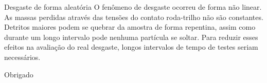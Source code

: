 \documentclass{beamer}
\begin{document}
\begin{frame}
\begin{block}{Desgaste de forma aleatória}
	O fenômeno de desgaste ocorreu de forma não linear. As massas perdidas através das tensões do contato roda-trilho não são constantes. Detritos maiores podem se quebrar da amostra de forma repentina, assim como durante um longo intervalo pode nenhuma partícula se soltar. Para reduzir esses efeitos na avaliação do real desgaste, longos intervalos de tempo de testes seriam necessários.
\end{block}

\end{frame}



\begin{frame}
\Huge{\centerline{Obrigado}}
\end{frame}
\end{document}
